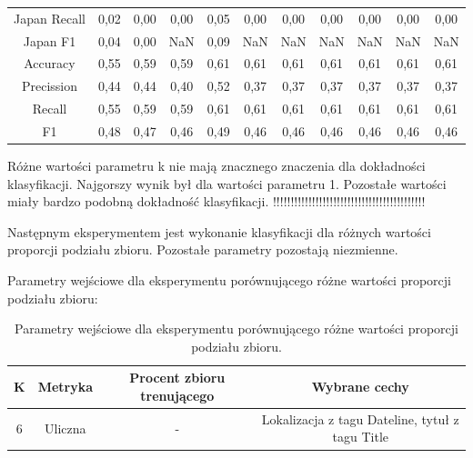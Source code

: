 \documentclass{classrep}
\begin{document}
\begin{table}[h!]
\begin{tabular}{c c c c c c c c c c c}
Japan Recall 			& 0,02 & 0,00 & 0,00 & 0,05 & 0,00 & 0,00 & 0,00 & 0,00 & 0,00 & 0,00 \\
Japan F1 				& 0,04 & 0,00 & NaN & 0,09 & NaN  & NaN & NaN & NaN & NaN & NaN\\
\hline
Accuracy 				& 0,55 & 0,59 & 0,59 & 0,61 & 0,61 & 0,61 & 0,61 & 0,61 & 0,61 & 0,61 \\
Precission 				& 0,44 & 0,44 & 0,40 & 0,52 & 0,37  & 0,37 & 0,37 &  0,37  & 0,37 & 0,37\\
Recall 				& 0,55 & 0,59 & 0,59 & 0,61 & 0,61 & 0,61 & 0,61 & 0,61 & 0,61 & 0,61  \\
F1 					& 0,48 & 0,47 & 0,46 & 0,49 & 0,46 & 0,46 & 0,46 & 0,46 & 0,46 & 0,46\\

\end {tabular}
\label {Wyniki klasyfikacji dla różnych wartości parametru k.}
\end{table}

Różne wartości parametru k nie mają znacznego znaczenia dla dokładności klasyfikacji. Najgorszy wynik był dla wartości parametru 1. Pozostałe wartości miały bardzo podobną dokładność klasyfikacji.  !!!!!!!!!!!!!!!!!!!!!!!!!!!!!!!!!!!!!!!!!!!


Następnym eksperymentem jest wykonanie klasyfikacji dla różnych wartości proporcji podziału zbioru. Pozostałe parametry pozostają niezmienne.

Parametry wejściowe dla eksperymentu porównującego różne wartości proporcji podziału zbioru:
 
\begin{table}[h!]
\caption{Parametry wejściowe dla eksperymentu porównującego różne wartości proporcji podziału zbioru. }
\centering
\vspace{0.1cm}
 \begin{tabular}{c c c c}
    \textbf{K} & \textbf{Metryka}   & \textbf{Procent zbioru trenującego}  & \textbf{Wybrane cechy}   \\
\hline
6 & Uliczna & - & Lokalizacja z tagu Dateline, tytuł z tagu Title\\
\end {tabular}
\label {Parametry wejściowe dla eksperymentu porównującego różne wartości proporcji podziału zbioru. }
\end{table}
\end{document}
